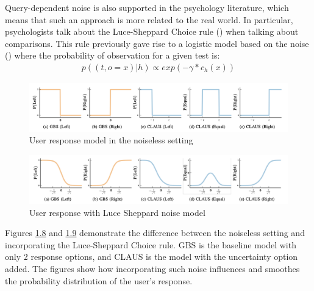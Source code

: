 \documentclass[
  letterpaper,
  DIV=11,
  numbers=noendperiod,
  oneside]{scrreprt}
\theoremstyle{remark}
\begin{document}
Query-dependent noise is also supported in the psychology literature,
which means that such an approach is more related to the real world. In
particular, psychologists talk about the Luce-Sheppard Choice rule
() when talking about comparisons.
This rule previously gave rise to a logistic model based on the noise
() where the
probability of observation for a given test is: \[\begin{aligned}
    p((t, o = x) | h) \propto exp(-\gamma * c_h(x))
    \label{eq:noise_model}
\end{aligned}\]

\begin{figure}

{\centering \includegraphics[width=1\textwidth,height=\textheight]{Figures/Noiseless probs.png}

}

\caption{User response model in the noiseless setting}

\end{figure}%
\begin{figure}

{\centering \includegraphics[width=1\textwidth,height=\textheight]{Figures/Noise probs.png}

}

\caption{User response with Luce Sheppard noise model}

\end{figure}%

Figures \hyperref[fig:noiseless_1]{1.8} and
\hyperref[fig:noiseless_2]{1.9} demonstrate the difference between the
noiseless setting and incorporating the Luce-Sheppard Choice rule. GBS
is the baseline model with only 2 response options, and CLAUS is the
model with the uncertainty option added. The figures show how
incorporating such noise influences and smoothes the probability
distribution of the user's response.
\end{document}
